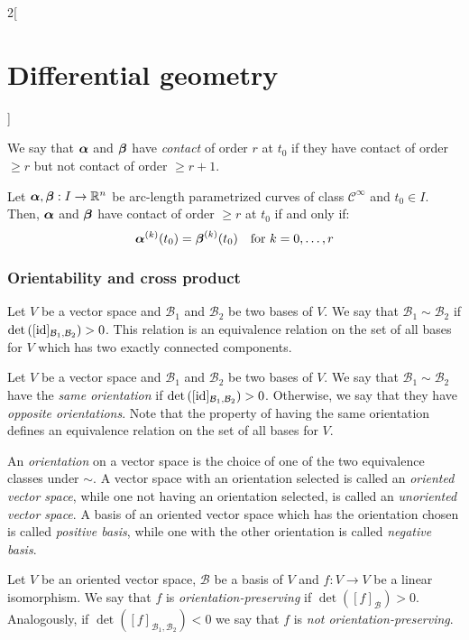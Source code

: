 \documentclass[../../../main.tex]{subfiles}
\begin{document}
\begin{multicols}{2}[\section{Differential geometry}]
\begin{definition}
    We say that $\boldsymbol{\mathrm{\alpha}}$ and $\boldsymbol{\mathrm{\beta}}$ have \emph{contact} of order $r$ at $t_0$ if they have contact of order $\geq r$ but not contact of order $\geq r+1$.
  \end{definition}
  \begin{proposition}
    Let $\boldsymbol{\mathrm{\alpha}},\boldsymbol{\mathrm{\beta}}:I\rightarrow\mathbb{R}^n$ be arc-length parametrized curves of class $\mathcal{C}^\infty$ and $t_0\in I$. Then, $\boldsymbol{\mathrm{\alpha}}$ and $\boldsymbol{\mathrm{\beta}}$ have contact of order $\geq r$ at $t_0$ if and only if: $$\boldsymbol{\mathrm{\alpha}}^{(k)}(t_0)=\boldsymbol{\mathrm{\beta}}^{(k)}(t_0)\quad\text{for }k=0,\ldots,r$$
  \end{proposition}
  \subsubsection{Orientability and cross product}
  \begin{definition}
    Let $V$ be a vector space and $\mathcal{B}_1$ and $\mathcal{B}_2$ be two bases of $V$. We say that $\mathcal{B}_1\sim\mathcal{B}_2$ if $\det\left([\mathrm{id}]_{\mathcal{B}_1,\mathcal{B}_2}\right)>0$. This relation is an equivalence relation on the set of all bases for $V$ which has two exactly connected components.
  \end{definition}
  \begin{definition}
    Let $V$ be a vector space and $\mathcal{B}_1$ and $\mathcal{B}_2$ be two bases of $V$. We say that $\mathcal{B}_1\sim\mathcal{B}_2$ have the \emph{same orientation} if $\det\left([\mathrm{id}]_{\mathcal{B}_1,\mathcal{B}_2}\right)>0$. Otherwise, we say that they have \emph{opposite orientations}. Note that the property of having the same orientation defines an equivalence relation on the set of all bases for $V$.
  \end{definition}
  \begin{definition}
    An \emph{orientation} on a vector space is the choice of one of the two equivalence classes under $\sim$. A vector space with an orientation selected is called an \emph{oriented vector space}, while one not having an orientation selected, is called an \emph{unoriented vector space}. A basis of an oriented vector space which has the orientation chosen is called \emph{positive basis}, while one with the other orientation is called \emph{negative basis}.
  \end{definition}
  \begin{definition}
    Let $V$ be an oriented vector space, $\mathcal{B}$ be a basis of $V$ and $f:V\rightarrow V$ be a linear isomorphism. We say that $f$ is \emph{orientation-preserving} if $\det \left([f]_{\mathcal{B}}\right)>0$. Analogously, if $\det \left([f]_{\mathcal{B}_1,\mathcal{B}_2}\right)<0$ we say that $f$ is \emph{not orientation-preserving}.

\end{definition}
\end{multicols}
\end{document}
